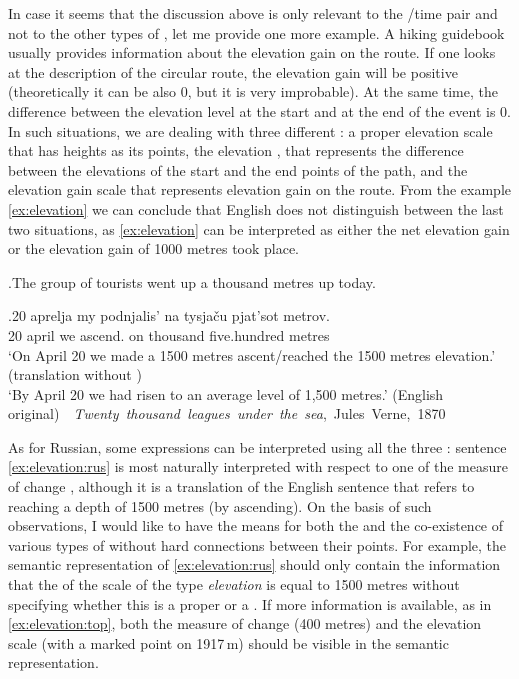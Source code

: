 In case it seems that the discussion above is only relevant to the /time pair and not to the other types of , let me provide one more example. A hiking guidebook usually provides information about the elevation gain on the route. If one looks at the description of the circular route, the elevation gain will be positive (theoretically it can be also 0, but it is very improbable). At the same time, the difference between the elevation level at the start and at the end of the event is 0. In such situations, we are dealing with three different : a proper elevation scale that has heights as its points, the elevation , that represents the difference between the elevations of the start and the end points of the path, and the elevation gain scale that represents  elevation gain on the route. From the example \ref{ex:elevation} we can conclude that English does not distinguish between the last two situations, as \ref{ex:elevation} can be interpreted as either the net elevation gain or the  elevation gain of 1000 metres took place. 

\ex.\label{ex:elevation}The group of tourists went up a thousand metres up today.

\exg.\label{ex:elevation:rus}20 aprelja my podnjalis' na tysja\v{c}u pjat'sot metrov.\\
20 april we ascend. on thousand five.hundred metres\\
\trans `On April 20 we made a 1500 metres ascent/reached the 1500 metres elevation.' (translation without )\\
`By April 20 we had risen to an average level of 1,500 metres.' (English original)~~\hbox{}\hfill\hbox{\textit{Twenty thousand leagues under the sea}, Jules Verne, 1870}

As for Russian, some expressions can be interpreted using all the three : sentence \ref{ex:elevation:rus} is most naturally interpreted with respect to one of the measure of change , although it is a translation of the English sentence that refers to reaching a depth of 1500 metres (by ascending). On the basis of such observations, I would like to have the means for both the  and the co-existence of various types of  without hard connections between their points. For example, the semantic representation of \ref{ex:elevation:rus} should only contain the information that the  of the scale of the type \textit{elevation} is equal to 1500 metres without specifying whether this is a proper or a . If more information is available, as in \ref{ex:elevation:top}, both the measure of change (400 metres) and the elevation scale (with a marked point on 1917\,m) should be visible in the semantic representation.

